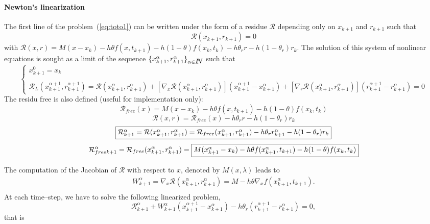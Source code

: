  \paragraph{Newton's linearization} The first line of the  problem~(\ref{eq:toto1}) can be written under the form of a residue $\mathcal R$ depending only on $x_{k+1}$ and $r_{k+1}$ such that 
\begin{equation}
  \label{eq:NL3}
  \mathcal R (x_{k+1},r _{k+1}) =0
\end{equation}
with $\mathcal R(x,r) = M(x - x_{k}) -h\theta f( x , t_{k+1}) - h(1-\theta)f(x_k,t_k) - h\theta _r r
- h(1-\theta_r)r_k$.
The solution of this system of nonlinear equations is sought as a limit of the sequence $\{ x^{\alpha}_{k+1},r^{\alpha}_{k+1} \}_{\alpha \in \mbox{\rm $I\!\!N$}}$ such that
 \begin{equation}
   \label{eq:NL7}
   \begin{cases}
     x^{0}_{k+1} = x_k \\ \\
     \mathcal R_L( x^{\alpha+1}_{k+1},r^{\alpha+1}_{k+1}) = \mathcal
     R(x^{\alpha}_{k+1},r^{\alpha}_{k+1})  + \left[ \nabla_{x} \mathcal
     R(x^{\alpha}_{k+1},r^{\alpha}_{k+1})\right] (x^{\alpha+1}_{k+1}-x^{\alpha}_{k+1} ) +
     \left[ \nabla_{r} \mathcal R(x^{\alpha}_{k+1},r^{\alpha}_{k+1})\right] (r^{\alpha+1}_{k+1} - r^{\alpha}_{k+1} ) =0
 \end{cases}
\end{equation}
The residu free is also defined (useful for implementation only):
\[\mathcal R _{free}(x) =  M(x - x_{k}) -h\theta f( x , t_{k+1}) - h(1-\theta)f(x_k,t_k)\]
\[\mathcal R (x,r) = \mathcal R _{free}(x)   - h\theta _r r - h(1-\theta_r)r_k\]
\[ \fbox{$\mathcal R^{\alpha}_{k+1} = \mathcal R (x^{\alpha}_{k+1},r^{\alpha}_{k+1}) = \mathcal R
_{free}(x^{\alpha}_{k+1},r^{\alpha}_{k+1} )  - h\theta _r r^{\alpha}_{k+1} - h(1-\theta_r)r_k$}\]
\[ \mathcal R _{free k+1} ^{\alpha} = \mathcal R
_{free}(x^{\alpha}_{k+1},r^{\alpha}_{k+1} )=\fbox{$M(x^{\alpha}_{k+1} - x_{k}) -h\theta f( x^{\alpha}_{k+1} , t_{k+1}) - h(1-\theta)f(x_k,t_k)$}\]
 
The computation of the Jacobian of $\mathcal R$ with respect to $x$, denoted by $M(x,\lambda)$ leads to 
\begin{equation}
   \label{eq:NL9}
   \begin{array}{l}
    W^{\alpha}_{k+1}= \nabla_{x} \mathcal R (x^{\alpha}_{k+1},r^{\alpha}_{k+1})= M - h  \theta \nabla_{x} f(  x^{\alpha}_{k+1}, t_{k+1} ).\\
 \end{array}
\end{equation}
At each time--step, we have to solve the following linearized problem,
\begin{equation}
   \label{eq:NL10}
    \mathcal R^{\alpha}_{k+1} + W^{\alpha}_{k+1} (x^{\alpha+1}_{k+1} -
    x^{\alpha}_{k+1}) - h \theta _r (r^{\alpha+1}_{k+1} - r^{\alpha}_{k+1} )  =0 ,
\end{equation}
that is

